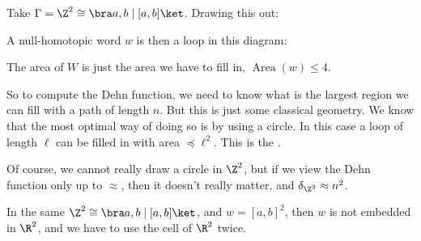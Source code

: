 \documentclass[a4paper]{article}
\DeclareMathOperator\Area{Area}
\begin{document}
\begin{eg}
  Take $\Gamma = \Z^2 \cong \bra a, b \mid [a, b]\ket$. Drawing this out:
  \begin{center}
  \end{center}
  A null-homotopic word $w$ is then a loop in this diagram:
  \begin{center}
  \end{center}
  The area of $W$ is just the area we have to fill in, $\Area(w) \leq 4$.

  So to compute the Dehn function, we need to know what is the largest region we can fill with a path of length $n$. But this is just some classical geometry. We know that the most optimal way of doing so is by using a circle. In this case a loop of length $\ell$ can be filled in with area $\preccurlyeq \ell^2$. This is the .

  Of course, we cannot really draw a circle in $\Z^2$, but if we view the Dehn function only up to $\approx$, then it doesn't really matter, and $\delta_{\Z^2} \approx n^2$.

\end{eg}

\begin{eg}
  In the same $\Z^2 \cong \bra a, b \mid [a, b] \ket$, and $w = [a, b]^2$, then $w$ is not embedded in $\R^2$, and we have to use the cell of $\R^2$ twice.
\end{eg}
\end{document}
